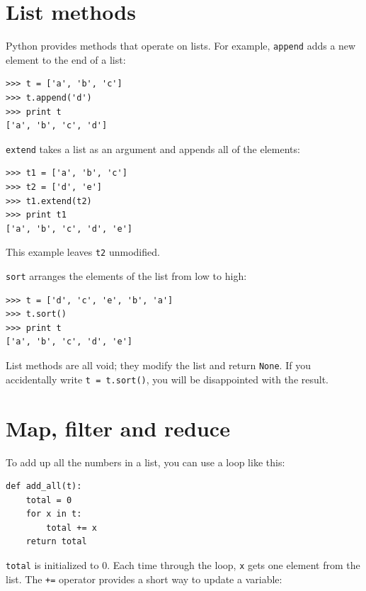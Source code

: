 \documentclass[10pt]{book}
\begin{document}
\section{List methods}


Python provides methods that operate on lists.  For example,
{\tt append} adds a new element to the end of a list:


\beforeverb
\begin{verbatim}
>>> t = ['a', 'b', 'c']
>>> t.append('d')
>>> print t
['a', 'b', 'c', 'd']
\end{verbatim}
\afterverb
%
{\tt extend} takes a list as an argument and appends all of
the elements:


\beforeverb
\begin{verbatim}
>>> t1 = ['a', 'b', 'c']
>>> t2 = ['d', 'e']
>>> t1.extend(t2)
>>> print t1
['a', 'b', 'c', 'd', 'e']
\end{verbatim}
\afterverb
%
This example leaves {\tt t2} unmodified.

{\tt sort} arranges the elements of the list from low to high:


\beforeverb
\begin{verbatim}
>>> t = ['d', 'c', 'e', 'b', 'a']
>>> t.sort()
>>> print t
['a', 'b', 'c', 'd', 'e']
\end{verbatim}
\afterverb
%
List methods are all void; they modify the list and return {\tt None}.
If you accidentally write {\tt t = t.sort()}, you will be disappointed
with the result.



\section{Map, filter and reduce}

To add up all the numbers in a list, you can use a loop like this:


\beforeverb
\begin{verbatim}
def add_all(t):
    total = 0
    for x in t:
        total += x
    return total
\end{verbatim}
\afterverb
%
{\tt total} is initialized to 0.  Each time through the loop,
{\tt x} gets one element from the list.  The {\tt +=} operator
provides a short way to update a variable:
\end{document}
